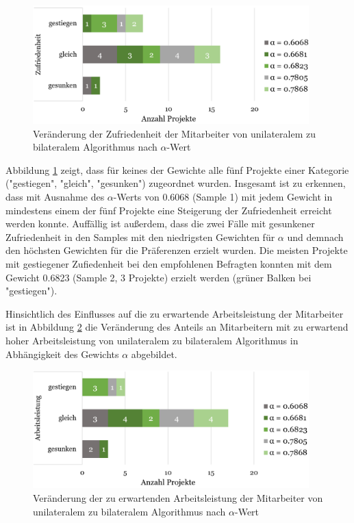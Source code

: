\begin{figure}[H]
    \centering
	\includegraphics[width=0.95\textwidth]{gfx/verhaeltnis-z-nach-alpha-ges.png}
	\caption[Veränderung der Zufriedenheit der Mitarbeiter von unilateralem zu bilateralem Algorithmus nach $\alpha$-Wert]{Veränderung der Zufriedenheit der Mitarbeiter von unilateralem zu bilateralem Algorithmus nach $\alpha$-Wert}
	\label{fig:ergebnisse:abb12}
\end{figure}

Abbildung \ref{fig:ergebnisse:abb12} zeigt, dass für keines der Gewichte alle fünf Projekte einer Kategorie ("gestiegen", "gleich", "gesunken") zugeordnet wurden.
Insgesamt ist zu erkennen, dass mit Ausnahme des $\alpha$-Werts von 0.6068 (Sample 1) mit jedem Gewicht in mindestens einem der fünf Projekte eine Steigerung der Zufriedenheit erreicht werden konnte.
Auffällig ist außerdem, dass die zwei Fälle mit gesunkener Zufriedenheit in den Samples mit den niedrigsten Gewichten für $\alpha$ und demnach den höchsten Gewichten für die Präferenzen erzielt wurden.
Die meisten Projekte mit gestiegener Zufiedenheit bei den empfohlenen Befragten konnten mit dem Gewicht 0.6823 (Sample 2, 3 Projekte) erzielt werden (grüner Balken bei "gestiegen").

Hinsichtlich des Einflusses auf die zu erwartende Arbeitsleistung der Mitarbeiter ist in Abbildung \ref{fig:ergebnisse:abb13} die Veränderung des Anteils an Mitarbeitern mit zu erwartend hoher Arbeitsleistung von unilateralem zu bilateralem Algorithmus in Abhängigkeit des Gewichts $\alpha$ abgebildet.

\begin{figure}[H]
    \centering
	\includegraphics[width=0.95\textwidth]{gfx/verhaeltnis-a-nach-alpha-ges.png}
	\caption[Veränderung der zu erwartenden Arbeitsleistung der Mitarbeiter von unilateralem zu bilateralem Algorithmus nach $\alpha$-Wert]{Veränderung der zu erwartenden Arbeitsleistung der Mitarbeiter von unilateralem zu bilateralem Algorithmus nach $\alpha$-Wert}
	\label{fig:ergebnisse:abb13}
\end{figure}

